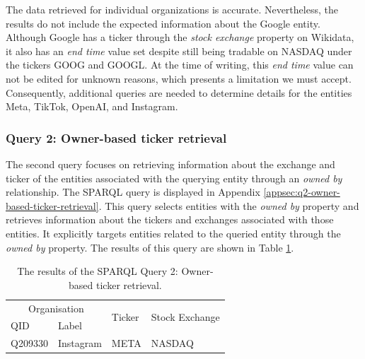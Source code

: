 {The data retrieved for individual organizations is accurate. Nevertheless, the results do not include the expected information about the Google entity. Although Google has a ticker through the \textit{stock exchange} property on Wikidata, it also has an \textit{end time} value set despite still being tradable on NASDAQ under the tickers GOOG and GOOGL. At the time of writing, this \textit{end time} value can not be edited for unknown reasons, which presents a limitation we must accept. Consequently, additional queries are needed to determine details for the entities Meta, TikTok, OpenAI, and Instagram.

\subsubsection{Query 2: Owner-based ticker retrieval}
\label{subsubsec:q2-owner-based-ticker-retrieval}

The second query focuses on retrieving information about the exchange and ticker of the entities associated with the querying entity through an \textit{owned by} relationship. The SPARQL query is displayed in Appendix \ref{appsec:q2-owner-based-ticker-retrieval}. This query selects entities with the \textit{owned by} property and retrieves information about the tickers and exchanges associated with those entities. It explicitly targets entities related to the queried entity through the \textit{owned by} property. The results of this query are shown in Table \ref{table:sparql_query_2_results}.

\begin{table}[ht]
    \centering
    \caption{The results of the SPARQL Query 2: Owner-based ticker retrieval.}
    \label{table:sparql_query_2_results}
    \begin{tabular}{l l l l}
    \hline
    \multicolumn{2}{c}{Organisation} & \multirow{2}{*}{Ticker} & \multirow{2}{*}{Stock Exchange}\\
    \cline{1-2}
    QID & Label \\
    \hline
    Q209330 & Instagram & META & NASDAQ \\ \hline
    \end{tabular}
\end{table}

}
